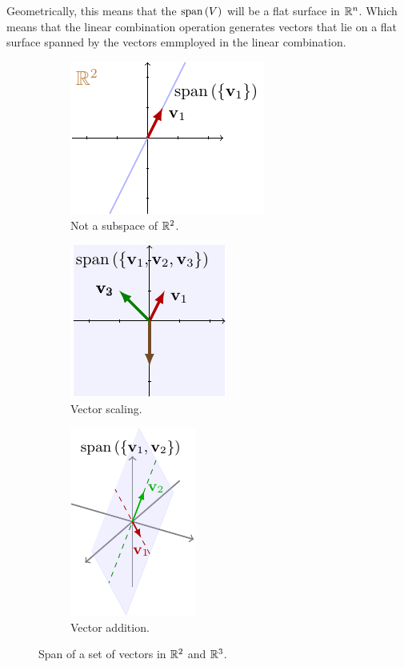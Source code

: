 Geometrically, this means that the $\text{span}\left( V\right)$ will be a flat surface in $\mathbb{R}^n$. Which means that the linear combination operation generates vectors that lie on a flat surface spanned by the vectors emmployed in the linear combination.

\begin{figure}[h]
    \centering
    \begin{subfigure}[b]{0.32\textwidth}
        \includegraphics{figure/chapter01/span(a).pdf}
        \caption{Not a subspace of $\mathbb{R}^2$.}
        \label{fig:span1}
    \end{subfigure}
    \begin{subfigure}[b]{0.32\textwidth}
        \centering
        \includegraphics{figure/chapter01/span(b).pdf}
        \caption{Vector scaling.}
        \label{fig:span2}
    \end{subfigure}
    \begin{subfigure}[b]{0.32\textwidth}
        \centering
        \includegraphics{figure/chapter01/span(c).pdf}
        \caption{Vector addition.}
        \label{fig:span3}
    \end{subfigure}
    \caption{Span of a set of vectors in $\mathbb{R}^2$ and $\mathbb{R}^3$.}
\end{figure}

